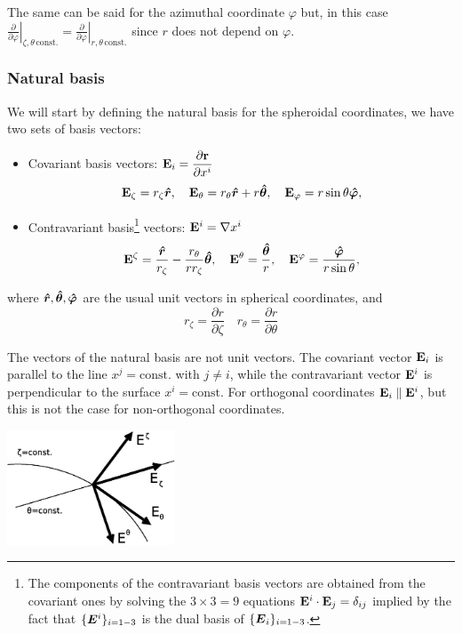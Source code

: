 The same can be said for the azimuthal coordinate $\varphi$ but, in this case
$\left.\frac{\partial}{\partial\varphi}\right|_{\zeta,\theta\,\mathrm{const.}}=
\left.\frac{\partial}{\partial\varphi}\right|_{r,\theta\,\mathrm{const.}}$
since $r$ does not depend on $\varphi$.

\subsubsection{Natural basis}

We will start by defining the natural basis for the spheroidal coordinates, we have two sets of basis vectors:
\begin{itemize}
\item Covariant basis vectors: $\displaystyle\mathbf{E}_i=\frac{\partial\mathbf{r}}
{\partial x^i}$
\begin{equation}
\mathbf{E}_\zeta=r_\zeta\boldsymbol{\hat r}, \quad
\mathbf{E}_\theta=r_\theta\boldsymbol{\hat r}+r\boldsymbol{\hat \theta}, \quad
\mathbf{E}_\varphi=r\sin\theta\boldsymbol{\hat \varphi},
\end{equation}
\item Contravariant basis\footnote{The components of the contravariant
basis vectors are obtained from the covariant ones by solving the
$3\times3=9$ equations $\mathbf{E}^i\cdot\mathbf{E}_j=\delta_{ij}$ implied by
the fact that $\{\vE^i\}_{i=1-3}$ is the dual basis of
$\{\vE_i\}_{i=1-3}$.} vectors: $\mathbf{E}^i=\nabla x^i$
\begin{equation}
\mathbf{E}^\zeta=\frac{\boldsymbol{\hat r}}{r_\zeta}-\frac{r_\theta}{rr_\zeta}\boldsymbol{\hat \theta}, \quad
\mathbf{E}^\theta=\frac{\boldsymbol{\hat \theta}}{r},\quad
\mathbf{E}^{\varphi}=\frac{\boldsymbol{\hat \varphi}}{r\sin\theta},
\end{equation}
\end{itemize}
\noindent where $\boldsymbol{\hat r},\boldsymbol{\hat \theta},\boldsymbol{\hat \varphi}$ are the usual unit vectors in spherical coordinates, and
$$r_\zeta=\frac{\partial r}{\partial\zeta}\quad r_\theta=\frac{\partial r}{\partial\theta}$$

The vectors of the natural basis are not unit vectors. The covariant vector $\mathbf{E}_i$ is parallel to 
the line $x^j=\mathrm{const.}$ with $j\ne i$, while the contravariant vector $\mathbf{E}^i$ is 
perpendicular to the surface $x^i=\mathrm{const.}$ For orthogonal coordinates $\mathbf{E}_i\parallel\mathbf{E}^i$, but
this is not the case for non-orthogonal coordinates.

\begin{center}
\includegraphics[width=5cm]{fig/vectors.eps}
\end{center}

